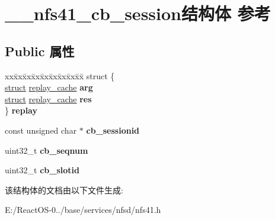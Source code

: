 \hypertarget{struct____nfs41__cb__session}{}\section{\+\_\+\+\_\+nfs41\+\_\+cb\+\_\+session结构体 参考}
\label{struct____nfs41__cb__session}
\subsection*{Public 属性}
\begin{DoxyCompactItemize}
\item 
\mbox{\label{struct____nfs41__cb__session_ac87e5a3b5cb8e7317a3d409e5cbcc380}} 
\begin{tabbing}
xx\=xx\=xx\=xx\=xx\=xx\=xx\=xx\=xx\=\kill
struct \{\\
\>\hyperlink{interfacestruct}{struct} \hyperlink{structreplay__cache}{replay\_cache} {\bfseries arg}\\
\>\hyperlink{interfacestruct}{struct} \hyperlink{structreplay__cache}{replay\_cache} {\bfseries res}\\
\} {\bfseries replay}\\

\end{tabbing}\item 
\mbox{\label{struct____nfs41__cb__session_ad49076d99d18514199e28fe2aecfcf46}} 
const unsigned char $\ast$ {\bfseries cb\+\_\+sessionid}
\item 
\mbox{\label{struct____nfs41__cb__session_a42f6868ea194d30e61e42358b7d51331}} 
uint32\+\_\+t {\bfseries cb\+\_\+seqnum}
\item 
\mbox{\label{struct____nfs41__cb__session_a265b7498450f9b46ff5ab947201514e7}} 
uint32\+\_\+t {\bfseries cb\+\_\+slotid}
\end{DoxyCompactItemize}


该结构体的文档由以下文件生成\+:\begin{DoxyCompactItemize}
\item 
E\+:/\+React\+O\+S-\/0../base/services/nfsd/nfs41.\+h\end{DoxyCompactItemize}
